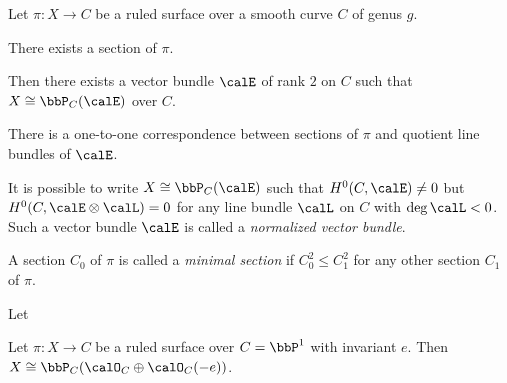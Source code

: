     Let \(\pi:X \to C\) be a ruled surface over a smooth curve \(C\) of genus \(g\).


    \begin{lemma}\label{lem:existence_of_section_of_ruled_surface}
        There exists a section of \(\pi\).
    \end{lemma}

    \begin{proposition}\label{prop:ruled_surface_as_projective_bundle}
        Then there exists a vector bundle \(\calE\) of rank \(2\) on \(C\) such that \(X \cong \bbP_C(\calE)\) over \(C\).
    \end{proposition}

    \begin{lemma}\label{lem:correspondence_between_sections_and_quotient_line_bundles}
        There is a one-to-one correspondence between sections of \(\pi\) and quotient line bundles of \(\calE\).
    \end{lemma}

    \begin{lemma}\label{lem:existence_of_normalized_vector_bundle}
        It is possible to write \(X \cong \bbP_C(\calE)\) such that \(H^0(C,\calE) \neq 0\) but \(H^0(C,\calE \otimes \calL) = 0\) for any line bundle \(\calL\) on \(C\) with \(\deg \calL < 0\).
        Such a vector bundle \(\calE\) is called a \emph{normalized vector bundle}.
    \end{lemma}

    \begin{definition}\label{def:minimal_section_of_ruled_surface}
        A section \(C_0\) of \(\pi\) is called a \emph{minimal section} if \(C_0^2 \leq C_1^2\) for any other section \(C_1\) of \(\pi\).
        
    \end{definition}

    \begin{theorem}\label{thm:restriction_of_e}
        Let
        
    \end{theorem}

    \begin{theorem}\label{thm:classification_of_ruled_surface_on_P1}
        Let \(\pi:X \to C\) be a ruled surface over \(C = \bbP^1\) with invariant \(e\).
        Then \(X \cong \bbP_{C}(\calO_C \oplus \calO_C(-e))\).
    \end{theorem}

